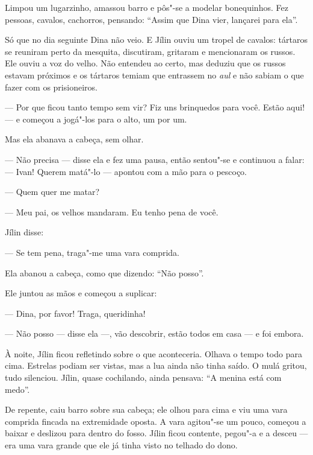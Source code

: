 Limpou um lugarzinho, amassou barro e pôs"-se a modelar bonequinhos. Fez
pessoas, cavalos, cachorros, pensando: ``Assim que Dina vier, lançarei
para ela''.

Só que no dia seguinte Dina não veio. E Jílin ouviu um tropel de
cavalos: tártaros se reuniram perto da mesquita, discutiram, gritaram e
mencionaram os russos. Ele ouviu a voz do velho. Não entendeu ao certo,
mas deduziu que os russos estavam próximos e os tártaros temiam que
entrassem no \emph{aul} e não sabiam o que fazer com os prisioneiros.


--- Por que ficou tanto tempo sem vir? Fiz uns brinquedos para você.
Estão aqui! --- e começou a jogá"-los para o alto, um por um.

Mas ela abanava a cabeça, sem olhar.

--- Não precisa --- disse ela e fez uma pausa, então sentou"-se e
continuou a falar: --- Ivan! Querem matá"-lo --- apontou com a mão para o
pescoço.

--- Quem quer me matar?

--- Meu pai, os velhos mandaram. Eu tenho pena de você.

Jílin disse:

--- Se tem pena, traga"-me uma vara comprida.

Ela abanou a cabeça, como que dizendo: ``Não posso''.

Ele juntou as mãos e começou a suplicar:

--- Dina, por favor! Traga, queridinha!

--- Não posso --- disse ela ---, vão descobrir, estão todos em casa ---
e foi embora.

À noite, Jílin ficou refletindo sobre o que aconteceria. Olhava o tempo
todo para cima. Estrelas podiam ser vistas, mas a lua ainda não tinha
saído. O mulá gritou, tudo silenciou. Jílin, quase cochilando, ainda
pensava: ``A menina está com medo''.

De repente, caiu barro sobre sua cabeça; ele olhou para cima e viu uma
vara comprida fincada na extremidade oposta. A vara agitou"-se um pouco,
começou a baixar e deslizou para dentro do fosso. Jílin ficou contente,
pegou"-a e a desceu --- era uma vara grande que ele já tinha visto no
telhado do dono.

